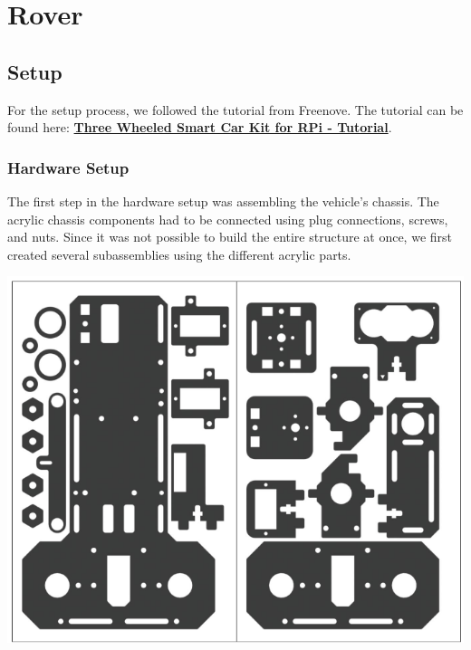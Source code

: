     \section{Rover}

    \subsection{Setup}
    For the setup process, we followed the tutorial from Freenove.
    The tutorial can be found here:
    \href{https://github.com/Freenove/Freenove_Three-wheeled_Smart_Car_Kit_for_Raspberry_Pi/blob/master/Tutorial.pdf}{\textbf{Three Wheeled Smart Car Kit for RPi - Tutorial}}.

    \subsubsection{Hardware Setup}

    \noindent
    \begin{minipage}[t]{0.63\textwidth}
        \vspace*{0pt}
        The first step in the hardware setup was assembling the vehicle’s chassis. The acrylic chassis components had to be connected using plug connections, screws, and nuts. Since it was not possible to build the entire structure at once, we first created several subassemblies using the different acrylic parts.
    \end{minipage}
    \hfill
    \begin{minipage}[t]{0.33\textwidth}
        \vspace*{0pt}
        \includegraphics[width=\linewidth]{img/acrylic_sheets}
    \end{minipage}

